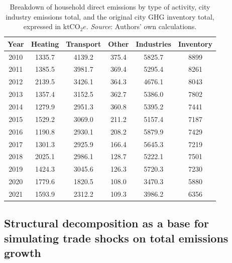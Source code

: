 \documentclass[
  10pt,
  twocolumn]{aft}
\begin{document}
\begin{table}[!h]
\centering\begingroup\fontsize{9}{10}\selectfont
\begin{tabular}[t]{cccccc}
\toprule
Year & Heating & Transport & Other & Industries & Inventory\\
\midrule
2010 & 1335.7 & 4139.2 & 375.4 & 5825.7 & 8899\\
2011 & 1385.5 & 3981.7 & 369.4 & 5295.4 & 8261\\
2012 & 2139.5 & 3426.1 & 364.3 & 4676.1 & 8043\\
2013 & 1357.4 & 3152.5 & 362.7 & 5386.0 & 7802\\
2014 & 1279.9 & 2951.3 & 360.8 & 5395.2 & 7441\\
2015 & 1529.2 & 3069.0 & 211.2 & 5157.4 & 7187\\
2016 & 1190.8 & 2930.1 & 208.2 & 5879.9 & 7429\\
2017 & 1301.3 & 2925.9 & 166.4 & 5645.3 & 7219\\
2018 & 2025.1 & 2986.1 & 128.7 & 5222.1 & 7501\\
2019 & 1424.3 & 3045.6 & 126.3 & 5720.3 & 7230\\
2020 & 1779.6 & 1820.5 & 108.0 & 3470.3 & 5880\\
2021 & 1593.9 & 2312.2 & 109.3 & 3986.2 & 6356\\
\bottomrule
\end{tabular}
\endgroup{}
\caption{Breakdown of household direct emissions by type of activity, city industry emissions total, and the original city GHG inventory total, expressed in $\text{ktCO}_2e$. \textit{Source}: Authors’ own calculations.\label{tab:total-emissions}}
\end{table}

\subsection{Structural decomposition as a base for simulating trade
shocks on total emissions growth}\label{sec-subsec-decomposition}
\end{document}
